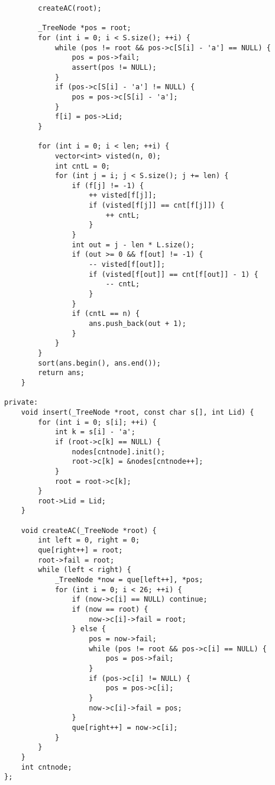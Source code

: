 \documentclass[courier]{article}
\begin{document}
\begin{CJK*}{UTF8}{gkai}
\begin{lstlisting}
        createAC(root);
        
        _TreeNode *pos = root;
        for (int i = 0; i < S.size(); ++i) {
            while (pos != root && pos->c[S[i] - 'a'] == NULL) {
                pos = pos->fail;
                assert(pos != NULL);
            }
            if (pos->c[S[i] - 'a'] != NULL) {
                pos = pos->c[S[i] - 'a'];
            }
            f[i] = pos->Lid;
        }
        
        for (int i = 0; i < len; ++i) {
            vector<int> visted(n, 0);
            int cntL = 0;
            for (int j = i; j < S.size(); j += len) {
                if (f[j] != -1) {
                    ++ visted[f[j]];
                    if (visted[f[j]] == cnt[f[j]]) {
                        ++ cntL;
                    }
                }
                int out = j - len * L.size();
                if (out >= 0 && f[out] != -1) {
                    -- visted[f[out]];
                    if (visted[f[out]] == cnt[f[out]] - 1) {
                        -- cntL;
                    }
                }
                if (cntL == n) {
                    ans.push_back(out + 1);
                }
            }
        }
        sort(ans.begin(), ans.end());
        return ans;
    }
    
private:
    void insert(_TreeNode *root, const char s[], int Lid) {
        for (int i = 0; s[i]; ++i) {
            int k = s[i] - 'a';
            if (root->c[k] == NULL) {
                nodes[cntnode].init();
                root->c[k] = &nodes[cntnode++];
            }
            root = root->c[k];
        }
        root->Lid = Lid;
    }
    
    void createAC(_TreeNode *root) {
        int left = 0, right = 0;
        que[right++] = root;
        root->fail = root;
        while (left < right) {
            _TreeNode *now = que[left++], *pos;
            for (int i = 0; i < 26; ++i) {
                if (now->c[i] == NULL) continue;
                if (now == root) {
                    now->c[i]->fail = root;
                } else {
                    pos = now->fail;
                    while (pos != root && pos->c[i] == NULL) {
                        pos = pos->fail;
                    }
                    if (pos->c[i] != NULL) {
                        pos = pos->c[i];
                    }
                    now->c[i]->fail = pos;
                }
                que[right++] = now->c[i];
            }
        }
    }
    int cntnode;
};

\end{lstlisting}



\end{CJK*}
\end{document}

